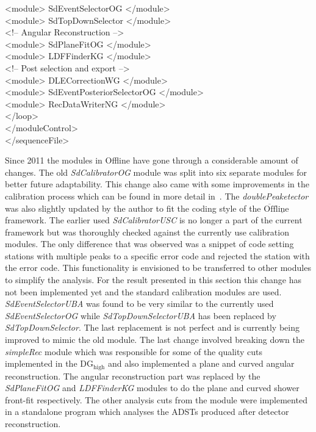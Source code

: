     \null\qquad \quad   <module> SdEventSelectorOG </module>\\
    \null\qquad \quad   <module> SdTopDownSelector </module>\\
    \null\qquad \quad  <!-- Angular Reconstruction -->\\
    \null\qquad \quad   <module> SdPlaneFitOG </module>\\
    \null\qquad \quad   <module> LDFFinderKG </module>\\
    \null\qquad \quad  <!-- Post selection and export -->\\
    \null\qquad \quad   <module> DLECorrectionWG </module>\\
    \null\qquad \quad   <module> SdEventPosteriorSelectorOG </module>\\
    \null\qquad \quad   <module> RecDataWriterNG </module>\\
  \null \qquad  </loop>\\
  \null \quad  </moduleControl>\\
   </sequenceFile>\\
\endgroup

Since 2011 the modules in Offline have gone through a considerable amount of changes. The old \textit{SdCalibratorOG} module was split into six separate modules for better future adaptability. This change also came with some improvements in the calibration process which can be found in more detail in~\cite{}. The \textit{doublePeaketector} was also slightly updated by the author to fit the coding style of the $\mathrm{\overline{Off}\underline{line}}$ framework. The earlier used \textit{SdCalibratorUSC} is no longer a part of the current framework but was thoroughly checked against the currently use calibration modules. The only difference that was observed was a snippet of code setting stations with multiple peaks to a specific error code and rejected the station with the error code. This functionality is envisioned to be transferred to other modules to simplify the analysis. For the result presented in this section this change has not been implemented yet and the standard calibration modules are used. \textit{SdEventSelectorUBA} was found to be very similar to the currently used \textit{SdEventSelectorOG} while \textit{SdTopDownSelectorUBA} has been replaced by \textit{SdTopDownSelector}. The last replacement is not perfect and is currently being improved to mimic the old module. The last change involved breaking down the \textit{simpleRec} module which was responsible for some of the quality cuts implemented in the DG$\mathrm{_{high}}$ and also implemented a plane and curved angular reconstruction. The angular reconstruction part was replaced by the \textit{SdPlaneFitOG} and \textit{LDFFinderKG} modules to do the plane and curved shower front-fit respectively. The other analysis cuts from the module were implemented in a standalone program which analyses the ADSTs produced after detector reconstruction. 

